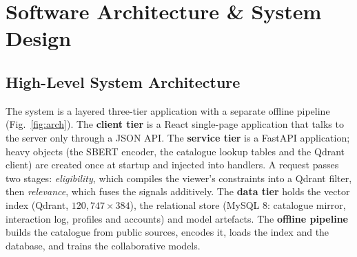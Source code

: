\documentclass[11pt, a4paper]{article}
\begin{document}
\section{Software Architecture \& System Design}

\subsection{High-Level System Architecture}
\noindent
The system is a layered three-tier application with a separate offline pipeline (Fig.~\ref{fig:arch}). The \textbf{client tier} is a React single-page application that talks to the server only through a JSON API. The \textbf{service tier} is a FastAPI application; heavy objects (the SBERT encoder, the catalogue lookup tables and the Qdrant client) are created once at startup and injected into handlers. A request passes two stages: \emph{eligibility}, which compiles the viewer's constraints into a Qdrant filter, then \emph{relevance}, which fuses the signals additively. The \textbf{data tier} holds the vector index (Qdrant, $120{,}747 \times 384$), the relational store (MySQL 8: catalogue mirror, interaction log, profiles and accounts) and model artefacts. The \textbf{offline pipeline} builds the catalogue from public sources, encodes it, loads the index and the database, and trains the collaborative models.
\end{document}
